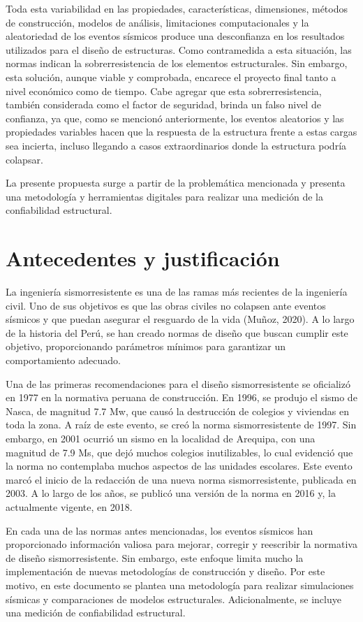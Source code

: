 Toda esta variabilidad en las propiedades, características, dimensiones, métodos de construcción, modelos de análisis, limitaciones computacionales y la aleatoriedad de los eventos sísmicos produce una desconfianza en los resultados utilizados para el diseño de estructuras. Como contramedida a esta situación, las normas indican la sobrerresistencia de los elementos estructurales. Sin embargo, esta solución, aunque viable y comprobada, encarece el proyecto final tanto a nivel económico como de tiempo. Cabe agregar que esta sobrerresistencia, también considerada como el factor de seguridad, brinda un falso nivel de confianza, ya que, como se mencionó anteriormente, los eventos aleatorios y las propiedades variables hacen que la respuesta de la estructura frente a estas cargas sea incierta, incluso llegando a casos extraordinarios donde la estructura podría colapsar.

La presente propuesta surge a partir de la problemática mencionada y presenta una metodología y herramientas digitales para realizar una medición de la confiabilidad estructural.

\section{Antecedentes y justificación}
La ingeniería sismorresistente es una de las ramas más recientes de la ingeniería civil. Uno de sus objetivos es que las obras civiles no colapsen ante eventos sísmicos y que puedan asegurar el resguardo de la vida (Muñoz, 2020). A lo largo de la historia del Perú, se han creado normas de diseño que buscan cumplir este objetivo, proporcionando parámetros mínimos para garantizar un comportamiento adecuado. 

Una de las primeras recomendaciones para el diseño sismorresistente se oficializó en 1977 en la normativa peruana de construcción. En 1996, se produjo el sismo de Nasca, de magnitud 7.7 Mw, que causó la destrucción de colegios y viviendas en toda la zona. A raíz de este evento, se creó la norma sismorresistente de 1997. Sin embargo, en 2001 ocurrió un sismo en la localidad de Arequipa, con una magnitud de 7.9 Ms, que dejó muchos colegios inutilizables, lo cual evidenció que la norma no contemplaba muchos aspectos de las unidades escolares. Este evento marcó el inicio de la redacción de una nueva norma sismorresistente, publicada en 2003. A lo largo de los años, se publicó una versión de la norma en 2016 y, la actualmente vigente, en 2018.

En cada una de las normas antes mencionadas, los eventos sísmicos han proporcionado información valiosa para mejorar, corregir y reescribir la normativa de diseño sismorresistente. Sin embargo, este enfoque limita mucho la implementación de nuevas metodologías de construcción y diseño. Por este motivo, en este documento se plantea una metodología para realizar simulaciones sísmicas y comparaciones de modelos estructurales. Adicionalmente, se incluye una medición de confiabilidad estructural.

